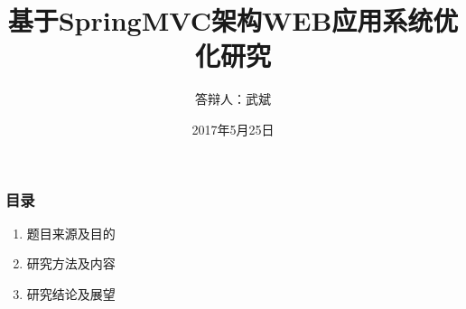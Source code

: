 \documentclass{beamer}
\title{基于SpringMVC架构WEB应用系统优化研究}
\author{答辩人：武斌}
\institute
{
  导师：郑海永\\
  电子系~中国海洋大学
  \and
   Department electronic engineering \\
  Ocean University Of China
}
\date{2017年5月25日}
\begin{document}
\begin{frame}
  \titlepage
\end{frame}


\begin{frame}
  \frametitle{目录}
  \begin{enumerate}
    \item<1-> 题目来源及目的
    \item<1-> 研究方法及内容
    \item<1-> 研究结论及展望
  \end{enumerate}
\end{frame}
\end{document}
